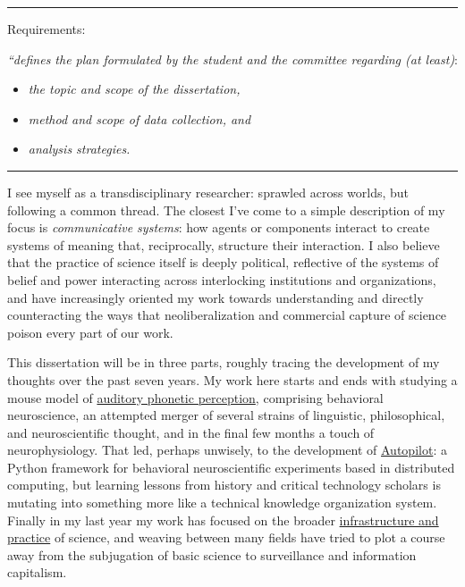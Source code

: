 
\hrule
\vspace{1em}

Requirements: 

\textit{``defines the plan formulated by the student and the committee regarding (at least)}:

\begin{itemize}
\item \textit{the topic and scope of the dissertation,}
\item \textit{method and scope of data collection, and}
\item \textit{analysis strategies.}
\end{itemize}

\vspace{1em}
\hrule
\vspace{2em}

I see myself as a transdisciplinary researcher: sprawled across worlds, but following a common thread. The closest I've come to a simple description of my focus is \textit{communicative systems}: how agents or components interact to create systems of meaning that, reciprocally, structure their interaction. I also believe that the practice of science itself is deeply political, reflective of the systems of belief and power interacting across interlocking institutions and organizations, and have increasingly oriented my work towards understanding and directly counteracting the ways that neoliberalization and commercial capture of science poison every part of our work.

This dissertation will be in three parts, roughly tracing the development of my thoughts over the past seven years. My work here starts and ends with studying a mouse model of \hyperref[sec:phonemes]{auditory phonetic perception}, comprising behavioral neuroscience, an attempted merger of several strains of linguistic, philosophical, and neuroscientific thought, and in the final few months a touch of neurophysiology. That led, perhaps unwisely, to the development of \hyperref[sec:autopilot]{Autopilot}: a Python framework for behavioral neuroscientific experiments based in distributed computing, but learning lessons from history and critical technology scholars is mutating into something more like a technical knowledge organization system. Finally in my last year my work has focused on the broader \hyperref[sec:infrastructure]{infrastructure and practice} of science, and weaving between many fields have tried to plot a course away from the subjugation of basic science to surveillance and information capitalism. 

